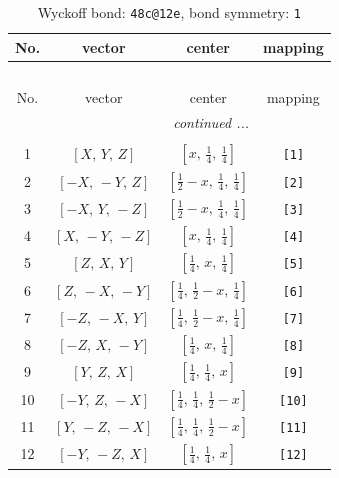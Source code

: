 \documentclass[fleqn,8pt]{jsarticle}
\begin{document}
\begin{longtable}{cccc}
\caption{Wyckoff bond: {\tt 48c@12e}, bond symmetry: {\tt 1}}
 \\
 \hline \hline
No. & vector & center & mapping \\ \hline \endfirsthead

\multicolumn{3}{l}{\tablename\ \thetable{}} \\
 \hline \hline
No. & vector & center & mapping \\ \hline \endhead

 \hline \hline
\multicolumn{3}{r}{\footnotesize\it continued ...} \\ \endfoot

 \hline \hline
\multicolumn{3}{r}{} \\ \endlastfoot

1 & $\left[ X,\, Y,\, Z \right]$ & $\left[ x,\, \frac{1}{4},\, \frac{1}{4} \right]$ & {\tt [1]} \\ \hline
2 & $\left[ - X,\, - Y,\, Z \right]$ & $\left[ \frac{1}{2} - x,\, \frac{1}{4},\, \frac{1}{4} \right]$ & {\tt [2]} \\ \hline
3 & $\left[ - X,\, Y,\, - Z \right]$ & $\left[ \frac{1}{2} - x,\, \frac{1}{4},\, \frac{1}{4} \right]$ & {\tt [3]} \\ \hline
4 & $\left[ X,\, - Y,\, - Z \right]$ & $\left[ x,\, \frac{1}{4},\, \frac{1}{4} \right]$ & {\tt [4]} \\ \hline
5 & $\left[ Z,\, X,\, Y \right]$ & $\left[ \frac{1}{4},\, x,\, \frac{1}{4} \right]$ & {\tt [5]} \\ \hline
6 & $\left[ Z,\, - X,\, - Y \right]$ & $\left[ \frac{1}{4},\, \frac{1}{2} - x,\, \frac{1}{4} \right]$ & {\tt [6]} \\ \hline
7 & $\left[ - Z,\, - X,\, Y \right]$ & $\left[ \frac{1}{4},\, \frac{1}{2} - x,\, \frac{1}{4} \right]$ & {\tt [7]} \\ \hline
8 & $\left[ - Z,\, X,\, - Y \right]$ & $\left[ \frac{1}{4},\, x,\, \frac{1}{4} \right]$ & {\tt [8]} \\ \hline
9 & $\left[ Y,\, Z,\, X \right]$ & $\left[ \frac{1}{4},\, \frac{1}{4},\, x \right]$ & {\tt [9]} \\ \hline
10 & $\left[ - Y,\, Z,\, - X \right]$ & $\left[ \frac{1}{4},\, \frac{1}{4},\, \frac{1}{2} - x \right]$ & {\tt [10]} \\ \hline
11 & $\left[ Y,\, - Z,\, - X \right]$ & $\left[ \frac{1}{4},\, \frac{1}{4},\, \frac{1}{2} - x \right]$ & {\tt [11]} \\ \hline
12 & $\left[ - Y,\, - Z,\, X \right]$ & $\left[ \frac{1}{4},\, \frac{1}{4},\, x \right]$ & {\tt [12]} \\ \hline

\end{longtable}
\end{document}
